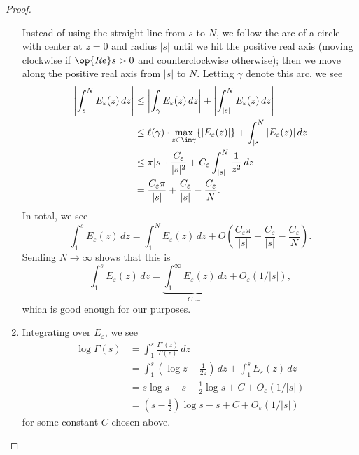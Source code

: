 \documentclass[../notes.tex]{subfiles}
\begin{document}
\begin{proof}
\begin{enumerate}
		Instead of using the straight line from $s$ to $N$, we follow the arc of a circle with center at $z=0$ and radius $|s|$ until we hit the positive real axis (moving clockwise if $\op{Re}s>0$ and counterclockwise otherwise); then we move along the positive real axis from $|s|$ to $N$. Letting $\gamma$ denote this arc, we see
		\begin{align*}
			\left|\int_s^NE_\varepsilon(z)\,dz\right|&\le\left|\int_\gamma E_\varepsilon(z)\,dz\right|+\left|\int_{|s|}^NE_\varepsilon(z)\,dz\right| \\
			&\le \ell(\gamma)\cdot\max_{z\in\im\gamma}\{|E_\varepsilon(z)|\}+\int_{|s|}^N|E_\varepsilon(z)|\,dz \\
			&\le \pi|s|\cdot\frac{C_\varepsilon}{|s|^2}+C_\varepsilon\int_{|s|}^N\frac1{z^2}\,dz \\
			&= \frac{C_\varepsilon\pi}{|s|}+\frac{C_\varepsilon}{|s|}-\frac{C_\varepsilon}N.
		\end{align*}
		In total, we see
		\[\int_1^sE_\varepsilon(z)\,dz=\int_1^NE_\varepsilon(z)\,dz+O\left(\frac{C_\varepsilon\pi}{|s|}+\frac{C_\varepsilon}{|s|}-\frac{C_\varepsilon}N\right).\]
		Sending $N\to\infty$ shows that this is
		\[\int_1^sE_\varepsilon(z)\,dz=\underbrace{\int_1^\infty E_\varepsilon(z)\,dz}_{C\coloneqq}{}+{}O_\varepsilon(1/|s|),\]
		which is good enough for our purposes.

		\item Integrating over $E_\varepsilon$, we see
		\begin{align*}
			\log\Gamma(s) &= \int_1^s\frac{\Gamma'(z)}{\Gamma(z)}\,dz \\
			&= \int_1^s\left(\log z-\frac1{2z}\right)\,dz+\int_1^sE_\varepsilon(z)\,dz \\
			&= s\log s-s-\frac12\log s+C+O_\varepsilon(1/|s|) \\
			&= \left(s-\frac12\right)\log s-s+C+O_\varepsilon(1/|s|)
		\end{align*}
		for some constant $C$ chosen above.
		

\end{enumerate}
\end{proof}
\end{document}
